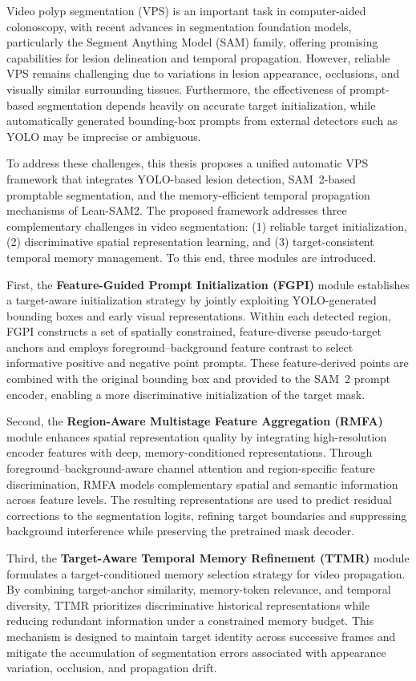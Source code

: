 Video polyp segmentation (VPS) is an important task in computer-aided
colonoscopy, with recent advances in segmentation foundation models,
particularly the Segment Anything Model (SAM) family, offering promising
capabilities for lesion delineation and temporal propagation. However,
reliable VPS remains challenging due to variations in lesion appearance,
occlusions, and visually similar surrounding tissues. Furthermore, the
effectiveness of prompt-based segmentation depends heavily on accurate
target initialization, while automatically generated bounding-box prompts
from external detectors such as YOLO may be imprecise or ambiguous.

To address these challenges, this thesis proposes a unified automatic VPS
framework that integrates YOLO-based lesion detection, SAM~2-based promptable
segmentation, and the memory-efficient temporal propagation mechanisms of
Lean-SAM2. The proposed framework addresses three complementary challenges
in video segmentation: (1) reliable target initialization, (2)
discriminative spatial representation learning, and (3) target-consistent
temporal memory management. To this end, three modules are introduced.

First, the \textbf{Feature-Guided Prompt Initialization (FGPI)} module
establishes a target-aware initialization strategy by jointly exploiting
YOLO-generated bounding boxes and early visual representations. Within
each detected region, FGPI constructs a set of spatially constrained,
feature-diverse pseudo-target anchors and employs foreground--background
feature contrast to select informative positive and negative point prompts.
These feature-derived points are combined with the original bounding box
and provided to the SAM~2 prompt encoder, enabling a more discriminative
initialization of the target mask.

Second, the \textbf{Region-Aware Multistage Feature Aggregation (RMFA)}
module enhances spatial representation quality by integrating high-resolution
encoder features with deep, memory-conditioned representations. Through
foreground--background-aware channel attention and region-specific feature
discrimination, RMFA models complementary spatial and semantic information
across feature levels. The resulting representations are used to predict
residual corrections to the segmentation logits, refining target boundaries
and suppressing background interference while preserving the pretrained
mask decoder.

Third, the \textbf{Target-Aware Temporal Memory Refinement (TTMR)}
module formulates a target-conditioned memory selection strategy for video
propagation. By combining target-anchor similarity, memory-token relevance,
and temporal diversity, TTMR prioritizes discriminative historical
representations while reducing redundant information under a constrained
memory budget. This mechanism is designed to maintain target identity across
successive frames and mitigate the accumulation of segmentation errors
associated with appearance variation, occlusion, and propagation drift.
